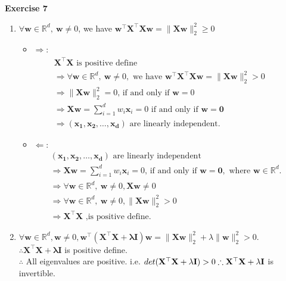 \documentclass[11pt,letter,notitlepage]{article}
\begin{document}
\begin{solution}
	\textbf{Exercise 7}
	\begin{enumerate}
		\item
		$\forall \mathbf{w} \in \mathbb{R}^d,~\mathbf{w}\neq 0$, we have $\mathbf{w^\top X^\top X w}=\|\mathbf{Xw}\|_2^2\geqslant 0$
		\begin{itemize}
			\item  
			$\Rightarrow$:
			\begin{align*}
				&\mathbf{X^\top X} \text{ is positive  define} \\
				&\Rightarrow\forall \mathbf{w} \in \mathbb{R}^d,~\mathbf{w}\neq 0, \text{ we have }\mathbf{w^\top X^\top X w}=\|\mathbf{Xw}\|_2^2> 0 ~~~~~~~~~~~~~~\\
				&\Rightarrow\|\mathbf{Xw}\|_2^2=0 \text{, if and only if } \mathbf{w}=0\\
				&\Rightarrow \mathbf{Xw}=\sum_{i=1}^d{w_i\mathbf{x}_i}=0\text{ if and only if }\mathbf{w=0}\\
				&\Rightarrow\mathbf{(x_1,x_2,\dots,x_d)}\text{ are linearly independent. }
			\end{align*}
			
			\item
			$\Leftarrow$:
			\begin{align*}
				&\mathbf{(x_1,x_2,\dots,x_d)}\text{ are linearly independent }\\
				&\Rightarrow  \mathbf{Xw}=\sum_{i=1}^d{w_i\mathbf{x}_i}=0 \text{, if and only if }\mathbf{w=0},\text{ where } \mathbf{w}\in \mathbb{R}^d.~~~~~~~\\
				&\Rightarrow \forall \mathbf{w}\in\mathbb{R}^d,~\mathbf{w}\neq 0, \mathbf{Xw}\neq 0\\
				&\Rightarrow \forall \mathbf{w}\in\mathbb{R}^d,~\mathbf{w}\neq 0,\| \mathbf{Xw}\|_2^2> 0\\
 				&\Rightarrow \mathbf{X^\top X} \text{ ,is positive define.}
			\end{align*}
		\end{itemize}
		
		\item
		$\forall \mathbf{w}\in\mathbb{R}^d, \mathbf{w}\neq 0,\mathbf{w^{\top}(X^{\top}X+\lambda I)w}=\|\mathbf{Xw}\|_2^2+\lambda\|\mathbf{w}\|_2^2>0.$\\
		$\therefore \mathbf{X^{\top}X+\lambda I}$ is positive define.\\
		$\therefore$ All eigenvalues are positive. i.e. $det(\mathbf{X^{\top}X+\lambda I})>0\\
		\therefore\mathbf{X^{\top}X+\lambda I}$ is invertible.
	\end{enumerate}

\end{solution}
\end{document}
